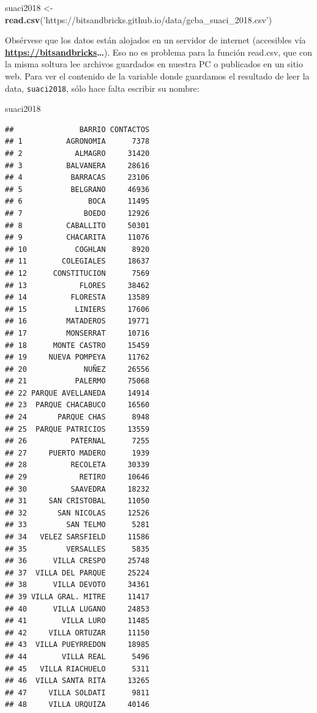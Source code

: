 \documentclass[]{book}
\newenvironment{Shaded}{\begin{snugshade}}{\end{snugshade}}
\newcommand{\KeywordTok}[1]{\textcolor[rgb]{0.13,0.29,0.53}{\textbf{#1}}}
\newcommand{\StringTok}[1]{\textcolor[rgb]{0.31,0.60,0.02}{#1}}
\newcommand{\NormalTok}[1]{#1}
\begin{document}
\begin{Shaded}
\begin{Highlighting}[]
\NormalTok{suaci2018 <-}\StringTok{ }\KeywordTok{read.csv}\NormalTok{(}\StringTok{'https://bitsandbricks.github.io/data/gcba_suaci_2018.csv'}\NormalTok{)}
\end{Highlighting}
\end{Shaded}

Obsérvese que los datos están alojados en un servidor de internet
(accesibles vía \textbf{\url{https://bitsandbricks}\ldots{}}). Eso no es
problema para la función read.csv, que con la misma soltura lee archivos
guardados en nuestra PC o publicados en un sitio web. Para ver el
contenido de la variable donde guardamos el resultado de leer la data,
\texttt{suaci2018}, sólo hace falta escribir su nombre:

\begin{Shaded}
\begin{Highlighting}[]
\NormalTok{suaci2018}
\end{Highlighting}
\end{Shaded}

\begin{verbatim}
##               BARRIO CONTACTOS
## 1          AGRONOMIA      7378
## 2            ALMAGRO     31420
## 3          BALVANERA     28616
## 4           BARRACAS     23106
## 5           BELGRANO     46936
## 6               BOCA     11495
## 7              BOEDO     12926
## 8          CABALLITO     50301
## 9          CHACARITA     11076
## 10           COGHLAN      8920
## 11        COLEGIALES     18637
## 12      CONSTITUCION      7569
## 13            FLORES     38462
## 14          FLORESTA     13589
## 15           LINIERS     17606
## 16         MATADEROS     19771
## 17         MONSERRAT     10716
## 18      MONTE CASTRO     15459
## 19     NUEVA POMPEYA     11762
## 20             NUÑEZ     26556
## 21           PALERMO     75068
## 22 PARQUE AVELLANEDA     14914
## 23  PARQUE CHACABUCO     16560
## 24       PARQUE CHAS      8948
## 25  PARQUE PATRICIOS     13559
## 26          PATERNAL      7255
## 27     PUERTO MADERO      1939
## 28          RECOLETA     30339
## 29            RETIRO     10646
## 30          SAAVEDRA     18232
## 31     SAN CRISTOBAL     11050
## 32       SAN NICOLAS     12526
## 33         SAN TELMO      5281
## 34   VELEZ SARSFIELD     11586
## 35         VERSALLES      5835
## 36      VILLA CRESPO     25748
## 37  VILLA DEL PARQUE     25224
## 38      VILLA DEVOTO     34361
## 39 VILLA GRAL. MITRE     11417
## 40      VILLA LUGANO     24853
## 41        VILLA LURO     11485
## 42     VILLA ORTUZAR     11150
## 43  VILLA PUEYRREDON     18985
## 44        VILLA REAL      5496
## 45   VILLA RIACHUELO      5311
## 46  VILLA SANTA RITA     13265
## 47     VILLA SOLDATI      9811
## 48     VILLA URQUIZA     40146
\end{verbatim}
\end{document}
